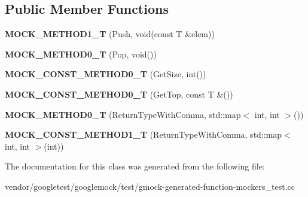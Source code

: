 \subsection*{Public Member Functions}
\begin{DoxyCompactItemize}
\item 
\mbox{\label{classtesting_1_1gmock__generated__function__mockers__test_1_1_mock_stack_a0ad833bc6134c5150b8271a5ba2e91b5}} 
{\bfseries M\+O\+C\+K\+\_\+\+M\+E\+T\+H\+O\+D1\+\_\+T} (Push, void(const T \&elem))
\item 
\mbox{\label{classtesting_1_1gmock__generated__function__mockers__test_1_1_mock_stack_a5e55ffb22e7f11c6940a97bd001bd50c}} 
{\bfseries M\+O\+C\+K\+\_\+\+M\+E\+T\+H\+O\+D0\+\_\+T} (Pop, void())
\item 
\mbox{\label{classtesting_1_1gmock__generated__function__mockers__test_1_1_mock_stack_a6171be20e8e4f44464cc8968e05b7c7a}} 
{\bfseries M\+O\+C\+K\+\_\+\+C\+O\+N\+S\+T\+\_\+\+M\+E\+T\+H\+O\+D0\+\_\+T} (Get\+Size, int())
\item 
\mbox{\label{classtesting_1_1gmock__generated__function__mockers__test_1_1_mock_stack_ae5950cfac08382a0ffc7c3bd5aba405f}} 
{\bfseries M\+O\+C\+K\+\_\+\+C\+O\+N\+S\+T\+\_\+\+M\+E\+T\+H\+O\+D0\+\_\+T} (Get\+Top, const T \&())
\item 
\mbox{\label{classtesting_1_1gmock__generated__function__mockers__test_1_1_mock_stack_a4b67d1f5b795e7c072fb846217a8f130}} 
{\bfseries M\+O\+C\+K\+\_\+\+M\+E\+T\+H\+O\+D0\+\_\+T} (Return\+Type\+With\+Comma, std\+::map$<$ int, int $>$())
\item 
\mbox{\label{classtesting_1_1gmock__generated__function__mockers__test_1_1_mock_stack_a69b9a7d0231b729d8a47201a49fa9166}} 
{\bfseries M\+O\+C\+K\+\_\+\+C\+O\+N\+S\+T\+\_\+\+M\+E\+T\+H\+O\+D1\+\_\+T} (Return\+Type\+With\+Comma, std\+::map$<$ int, int $>$(int))
\end{DoxyCompactItemize}


The documentation for this class was generated from the following file\+:\begin{DoxyCompactItemize}
\item 
vendor/googletest/googlemock/test/gmock-\/generated-\/function-\/mockers\+\_\+test.\+cc\end{DoxyCompactItemize}
